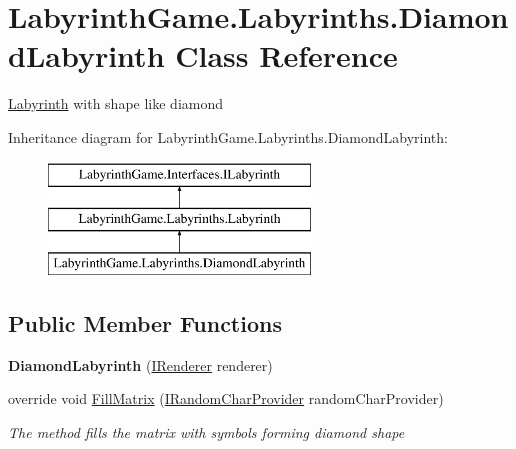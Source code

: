 \hypertarget{class_labyrinth_game_1_1_labyrinths_1_1_diamond_labyrinth}{\section{Labyrinth\+Game.\+Labyrinths.\+Diamond\+Labyrinth Class Reference}
\label{class_labyrinth_game_1_1_labyrinths_1_1_diamond_labyrinth}
}


\hyperlink{class_labyrinth_game_1_1_labyrinths_1_1_labyrinth}{Labyrinth} with shape like diamond  


Inheritance diagram for Labyrinth\+Game.\+Labyrinths.\+Diamond\+Labyrinth\+:\begin{figure}[H]
\begin{center}
\leavevmode
\includegraphics[height=3.000000cm]{class_labyrinth_game_1_1_labyrinths_1_1_diamond_labyrinth}
\end{center}
\end{figure}
\subsection*{Public Member Functions}
\begin{DoxyCompactItemize}
\item 
\hypertarget{class_labyrinth_game_1_1_labyrinths_1_1_diamond_labyrinth_ae4452baf90cdc6f083fcb8c96b007ea8}{{\bfseries Diamond\+Labyrinth} (\hyperlink{interface_labyrinth_game_1_1_interfaces_1_1_i_renderer}{I\+Renderer} renderer)}\label{class_labyrinth_game_1_1_labyrinths_1_1_diamond_labyrinth_ae4452baf90cdc6f083fcb8c96b007ea8}

\item 
override void \hyperlink{class_labyrinth_game_1_1_labyrinths_1_1_diamond_labyrinth_ae110be09830e8a79d733e37d4916edde}{Fill\+Matrix} (\hyperlink{interface_labyrinth_game_1_1_interfaces_1_1_i_random_char_provider}{I\+Random\+Char\+Provider} random\+Char\+Provider)
\begin{DoxyCompactList}\small\item\em The method fills the matrix with symbols forming diamond shape \end{DoxyCompactList}\end{DoxyCompactItemize}
